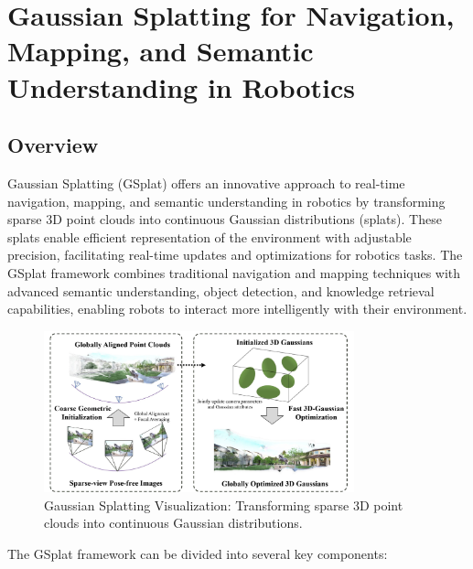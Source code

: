 \chapter{Gaussian Splatting for Navigation, Mapping, and Semantic Understanding in Robotics}

\section{Overview}

Gaussian Splatting (GSplat) offers an innovative approach to real-time
navigation, mapping, and semantic understanding in robotics by transforming
sparse 3D point clouds into continuous Gaussian distributions (splats). These
splats enable efficient representation of the environment with adjustable
precision, facilitating real-time updates and optimizations for robotics tasks.
The GSplat framework combines traditional navigation and mapping techniques
with advanced semantic understanding, object detection, and knowledge retrieval
capabilities, enabling robots to interact more intelligently with their
environment.\cite{kim2024openvlaopensourcevisionlanguageactionmodel}


\begin{figure}[h!]
      \centering
      \includegraphics[width=0.8\textwidth]{gaussian_splatting_diagram.png}
      \caption{Gaussian Splatting Visualization: Transforming sparse 3D point clouds into continuous Gaussian distributions.}
      \label{fig:gaussian_splatting}
  \end{figure}

The GSplat framework can be divided into several key components:


